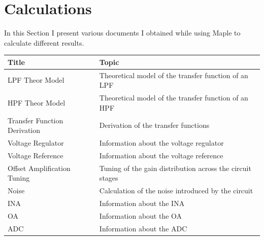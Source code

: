 \documentclass[a4paper, 10pt, final]{article} %
\begin{document}
    \section{Calculations} \label{sec:Calculations}
    In this Section I present various documents I obtained while using Maple to calculate different results.
    \begin{center}
        \begin{tabular}{ ||l|l|| }
            \hline
            \multicolumn{1}{||l|}{Title} & \multicolumn{1}{|l||}{Topic} \\
            \hline
            \hline
            LPF Theor Model & Theoretical model of the transfer function of an LPF \\
            HPF Theor Model & Theoretical model of the transfer function of an HPF \\
            Transfer Function Derivation & Derivation of the transfer functions \\
            Voltage Regulator & Information about the voltage regulator \\
            Voltage Reference & Information about the voltage reference \\
            Offset Amplification Tuning & Tuning of the gain distribution across the circuit stages \\
            Noise & Calculation of the noise introduced by the circuit \\
            INA & Information about the INA \\
            OA & Information about the OA \\
            ADC & Information about the ADC \\
            \hline
        \end{tabular}
    \end{center}

    
    
    
    
    
    
    
    
    
    

    \printbibheading
    \printbibliography[keyword=major, heading=subbibliography, title={Key Sources}]
    \printbibliography[keyword=minor, heading=subbibliography, title={Secondary Sources}]
    \printbibliography[keyword=data, heading=subbibliography, title={Data Sources}]
    \printbibliography[keyword=image, heading=subbibliography, title={Image Sources}]
    \printbibliography[keyword=datasheet, heading=subbibliography, title={Datasheet Sources}]
    \printbibliography[keyword=software, heading=subbibliography, title={Software Sources}]
    \printbibliography[keyword=web, heading=subbibliography, title={Component Sources}]
\end{document}
